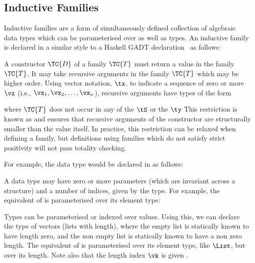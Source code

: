 \subsection{Inductive Families}

\label{sect:inductivefams}

Inductive families \cite{dybjer1994inductive} are a form of simultaneously
defined collection of algebraic data types which can be parameterised over
 as well as types.  An inductive family is declared 
in a similar style to a Haskell GADT declaration~\cite{pj2006gadts}
as
follows:


A constructor $\TC{D}$ of a family $\TC{T}$ must return a value in the family
$\TC{T}$.
It may take recursive arguments in the family $\TC{T}$ which may be
higher order. 
Using vector notation, $\tx$, to indicate a
sequence of zero or more $\vx$ (i.e., $\vx_1,\vx_2,\ldots,\vx_n$),
recursive arguments have types of the form


where $\TC{T}$ does not occur in any of the $\tS$ or the $\ty$
This restriction is known as
 and ensures that recursive arguments of the
constructor are structurally smaller than the value itself.
In
practice, this restriction can be relaxed when defining a family, but definitions
using families which do not satisfy strict positivity will not pass totality
checking.

For example, the \Idris{} data type  would be declared in \TT{} as follows:

\DM{
\Data\hg\Nat\Hab\Type\hg\Where\hg\Z\Hab\Nat\;\mid\;\suc\Hab\fbind{\vk}{\Nat}{\Nat}
}

A data type may have zero or more parameters (which are invariant
across a structure) and a number of indices, given by the type. For example,
the \TT{} equivalent of  is parameterised over its element type:

\DM{
\AR{
\Data\hg\List\Hab(\va\Hab\Type)\to\Type\hg\Where\\
\hg\hg
\ARd{
& \nil\Hab\List\;\va\\
\mid & (\cons)\Hab\fbind{\vx}{\va}{\fbind{\vxs}{\List\;\va}{\List\;\va}}
}
}
}

Types can be
parameterised or indexed over values. Using this, we can declare the type of
vectors (lists with length), where the empty list is statically known
to have length zero, and the non empty list is statically known to
have a non zero length. The \TT{} equivalent of  is parameterised over its element type,
like $\List$, but  over its length. Note also that the length
index $\vk$ is given .

